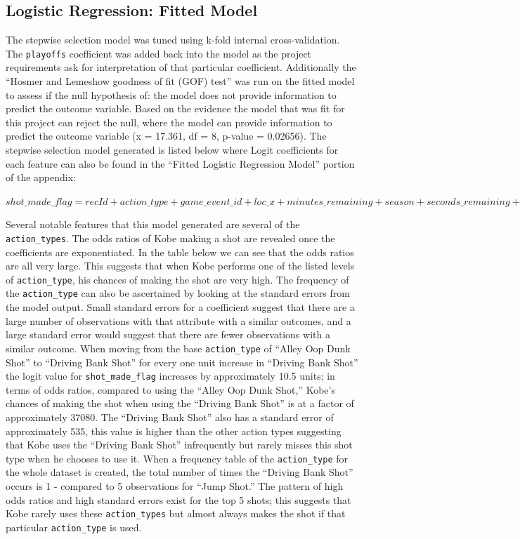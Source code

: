 \documentclass[american,]{article}
\begin{document}
\hypertarget{logistic-regression-fitted-model}{%
\subsection{\texorpdfstring{\textbf{Logistic Regression: Fitted Model}}{Logistic Regression: Fitted Model}}\label{logistic-regression-fitted-model}}

The stepwise selection model was tuned using k-fold internal cross-validation. The \texttt{playoffs} coefficient was added back into the model as the project requirements ask for interpretation of that particular coefficient. Additionally the ``Hosmer and Lemeshow goodness of fit (GOF) test'' was run on the fitted model to assess if the null hypothesis of: the model does not provide information to predict the outcome variable. Based on the evidence the model that was fit for this project can reject the null, where the model can provide information to predict the outcome variable (x = 17.361, df = 8, p-value = 0.02656). The stepwise selection model generated is listed below where Logit coefficients for each feature can also be found in the ``Fitted Logistic Regression Model'' portion of the appendix:

\(shot\_made\_flag = recId + action\_type + game\_event\_id + loc\_x + minutes\_remaining + season + seconds\_remaining + shot\_distance + game\_date + shot\_id + attendance + arena\_temp + playoffs\)

Several notable features that this model generated are several of the \texttt{action\_types}. The odds ratios of Kobe making a shot are revealed once the coefficients are exponentiated. In the table below we can see that the odds ratios are all very large. This suggests that when Kobe performs one of the listed levels of \texttt{action\_type}, his chances of making the shot are very high. The frequency of the \texttt{action\_type} can also be ascertained by looking at the standard errors from the model output. Small standard errors for a coefficient suggest that there are a large number of observations with that attribute with a similar outcomes, and a large standard error would suggest that there are fewer observations with a similar outcome. When moving from the base \texttt{action\_type} of ``Alley Oop Dunk Shot'' to ``Driving Bank Shot'' for every one unit increase in ``Driving Bank Shot'' the logit value for \texttt{shot\_made\_flag} increases by approximately 10.5 units; in terms of odds ratios, compared to using the ``Alley Oop Dunk Shot,'' Kobe's chances of making the shot when using the ``Driving Bank Shot'' is at a factor of approximately 37080. The ``Driving Bank Shot'' also has a standard error of approximately 535, this value is higher than the other action types suggesting that Kobe uses the ``Driving Bank Shot'' infrequently but rarely misses this shot type when he chooses to use it. When a frequency table of the \texttt{action\_type} for the whole dataset is created, the total number of times the ``Driving Bank Shot'' occurs is 1 - compared to 5 observations for ``Jump Shot.'' The pattern of high odds ratios and high standard errors exist for the top 5 shots; this suggests that Kobe rarely uses these \texttt{action\_types} but almost always makes the shot if that particular \texttt{action\_type} is used.
\end{document}
